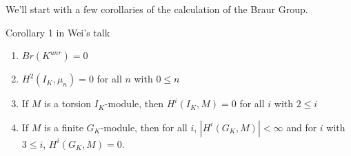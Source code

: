 We'll start with a few corollaries of the calculation of the Braur Group.

Corollary 1 in Wei's talk


\begin{proposition}
	\begin{enumerate}[(1)]
		\item \(Br(K^{unr}) = 0\)
		\item \(H^{2}(I_{K},\mu_{n}) = 0\) for all \(n\) with \(0 \leq n\)
		\item If \(M\) is a torsion \(I_{K}\)-module, then
			\(H^{i}(I_{K},M) = 0\) for all \(i\) with \(2 \leq i\)
		\item If \(M\) is a finite \(G_{K}\)-module, then
			for all \(i\), \(\left| H^{i}(G_{K},M) \right| < \infty\) 
			and for \(i\) with \(3 \leq i\), 
			\(H^{i}(G_{K},M) = 0\).
	\end{enumerate}
\end{proposition}



